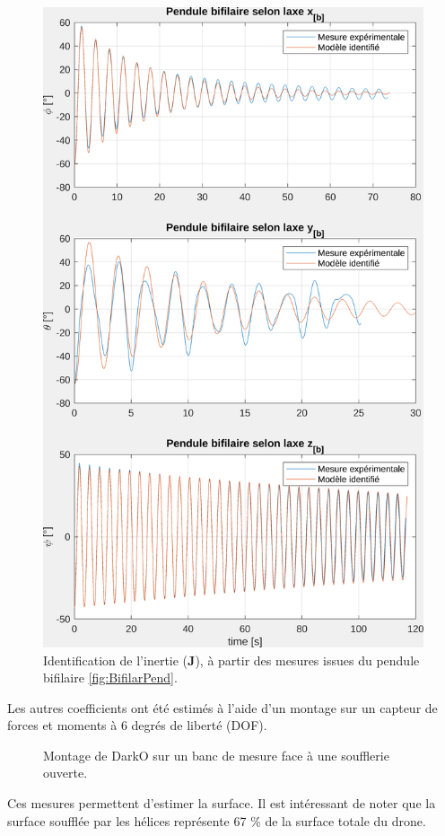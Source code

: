     \begin{figure}[ht!]
    \centerline{
    \includegraphics[trim=0cm 0cm 0cm 0cm,clip,width=0.6\columnwidth]{figures/ident_inertia.png}}
    \caption{Identification de l'inertie ($\boldsymbol{J}$), à partir des mesures issues du pendule bifilaire \ref{fig:BifilarPend}.}
    \label{fig:BifilarPend_meas}
    \end{figure}


    
    Les autres coefficients ont été estimés à l'aide d'un montage sur un capteur de forces et moments à 6 degrés de liberté (DOF). 
    \begin{figure}[ht!]
        \centering
        \caption{Montage de DarkO sur un banc de mesure face à une soufflerie ouverte.}
        \label{fig:montage_ident}
    \end{figure}
    Ces mesures permettent d'estimer la surface. Il est intéressant de noter que la surface soufflée par les hélices représente 67 \% de la surface totale du drone.
    


